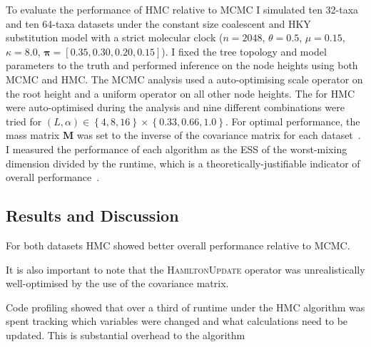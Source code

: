 \documentclass{article}
\renewcommand{\vec}[1]{\ensuremath{\boldsymbol{\mathbf{#1}}}}
\newcommand{\mat}[1]{\ensuremath{\boldsymbol{\mathbf{#1}}}}
\begin{document}
    To evaluate the performance of \ac{HMC} relative to \ac{MCMC} I simulated
        ten 32-taxa and ten 64-taxa datasets under the constant size coalescent
        and HKY substitution model with a strict molecular clock ($n = 2048$,
        $\theta = 0.5$, $\mu = 0.15$, $\kappa = 8.0$,
        $\vec{\pi} = \left[0.35, 0.30, 0.20, 0.15\right]$).
    I fixed the tree topology and model parameters to the truth and performed
        inference on the node heights using both \ac{MCMC} and \ac{HMC}.
    The \ac{MCMC} analysis used a auto-optimising scale operator on the root
        height and a uniform operator on all other node heights.
    The for \ac{HMC} were auto-optimised
        during the analysis and nine different combinations were tried for
        $\left(L, \alpha\right) \in \left\{4, 8, 16\right\} \times \left\{0.33, 0.66, 1.0\right\}$.
    For optimal performance, the mass matrix $\mat{M}$ was set to the inverse
        of the covariance matrix for each dataset~\cite{Nea11}.
    I measured the performance of each algorithm as the \ac{ESS} of the
        worst-mixing dimension divided by the runtime, which is a
        theoretically-justifiable indicator of overall
        performance~\cite{Tho10}.

    \subsection*{Results and Discussion}

    For both datasets \ac{HMC} showed better overall performance relative to
        \ac{MCMC}.

    It is also important to note that the \textsc{HamiltonUpdate} operator was
        unrealistically well-optimised by the use of the covariance matrix.

    Code profiling showed that over a third of runtime under the \ac{HMC}
        algorithm was spent tracking which variables were changed and what
        calculations need to be updated.
    This is substantial overhead to the algorithm
\end{document}
